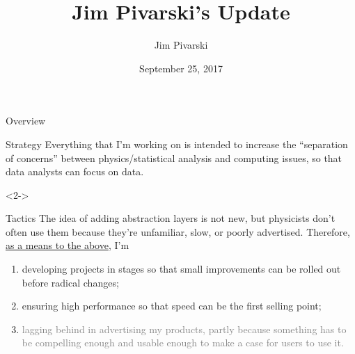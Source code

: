 \documentclass{beamer}
\title[2017-09-25-dianahep-update]{Jim Pivarski's Update}
\author{Jim Pivarski}
\institute{Princeton University -- DIANA}
\date{September 25, 2017}
\begin{document}

\begin{frame}
  \titlepage
\end{frame}




\begin{frame}{Overview}
\vspace{0.25 cm}
\begin{block}{Strategy}
Everything that I'm working on is intended to increase the ``separation of concerns'' between physics/statistical analysis and computing issues, so that data analysts can focus on data.
\end{block}

\begin{uncoverenv}<2->
\begin{block}{Tactics}
The idea of adding abstraction layers is not new, but physicists don't often use them because they're unfamiliar, slow, or poorly advertised. Therefore, \underline{as a means to the above}, I'm
\begin{enumerate}
\item<3-> developing projects in stages so that small improvements can be rolled out before radical changes;
\item<4-> ensuring high performance so that speed can be the first selling point;
\item<5-> \textcolor{gray}{lagging behind in advertising my products, partly because something has to be compelling enough and usable enough to make a case for users to use it.}
\end{enumerate}
\end{block}
\end{uncoverenv}
\end{frame}
\end{document}
